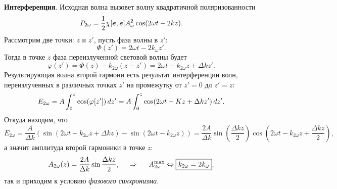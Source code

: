 \textbf{Интерференция}. Исходная волна вызовет волну квадратичной поляризованности
\begin{equation*}
    P_{2 \omega} = \frac{1}{2} \chi[\mbox{\boldmath $e$}, \mbox{\boldmath $e$}] A_\omega^2 \cos(2 \omega t - 2 k z).
\end{equation*}
Рассмотрим две точки: $z$ и $z'$, пусть фаза волны в $z'$:
\begin{equation*}
    \Phi(z') = 2 \omega t - 2 k_\omega z'.
\end{equation*}
Тогда в точке $z$ фаза переизлученной световой волны будет
\begin{equation*}
    \varphi(z') = \Phi(z) - k_{2 \omega} (z-z') = 2 \omega t - k_{2 \omega} z + \Delta k z'.
\end{equation*}
Результирующая волна второй гармони есть результат интерференции волн, переизлученных в различных точках $z'$ на промежутку от $z' = 0$  дл $z' =z$:
\begin{equation*}
    E_{2 \omega} = A \int_{0}^{z}  \cos(\varphi[z']) \, d z' = A \int_{0}^{z}  \cos(2 \omega t - K z + \Delta k z') \, d z'.
\end{equation*}
Откуда находим, что
\begin{equation*}
    E_{2 \omega} = \frac{A}{\Delta k} \left(
        \sin(2 \omega t - k_{2 \omega} z + \Delta k z) - \sin(2 \omega t - k_{2 \omega} z)
    \right) = \frac{2 A}{\Delta k} \sin\left(\frac{\Delta k z}{2}\right) \cos\left(
        2 \omega t - k_{2 \omega} z + \frac{\Delta k z}{2}
    \right),
\end{equation*}
а значит амплитуда второй гармоники в точке $z$:
\begin{equation*}
    A_{2 \omega} (z) = \frac{2 A}{\Delta k} \sin \frac{\Delta k z}{2},
    \hspace{0.5cm} \Rightarrow \hspace{0.5cm}
    A_{2 \omega}^{\text{max}} \Leftrightarrow \boxed{k_{2 \omega} = 2 k_{\omega}},
\end{equation*}
так и приходим к условию \textit{фазового синхронизма}.

